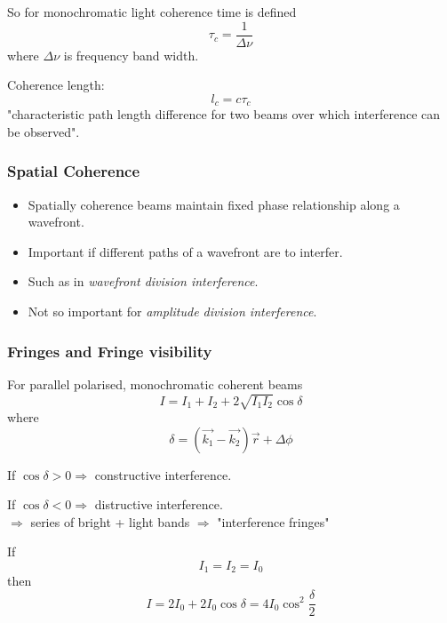 \documentclass[10pt]{article}
\begin{document}
So for monochromatic light coherence time is defined
\begin{equation}\boxed{
\tau_c = \frac{1}{\Delta \nu}
}\end{equation}
where $\Delta \nu$ is frequency band width.

Coherence length:
\begin{equation}\boxed{
l_c = c \tau_c
}\end{equation}
"characteristic path length difference for two beams over which interference can be observed".
\subsubsection{Spatial Coherence}
\begin{itemize}
\item Spatially coherence beams maintain fixed phase relationship along a wavefront.
\item Important if different paths of a wavefront are to interfer.
\item Such as in \textit{wavefront division interference}.
\item Not so important for \textit{amplitude division interference}.
\end{itemize}

\subsubsection{Fringes and Fringe visibility}
For parallel polarised, monochromatic coherent beams
\begin{equation}\boxed{
I = I_1 + I_2 + 2 \sqrt{I_1I_2}\cos{\delta}
}\end{equation}
where
\begin{equation*}
\delta = (\vec{k_1} - \vec{k_2})\vec{r} + \Delta \phi
\end{equation*}

If $\cos{\delta} > 0 \Rightarrow$ constructive interference.

If $\cos{\delta} < 0 \Rightarrow$ distructive interference.\\
$\Rightarrow$ series of bright + light bands $\Rightarrow$ "interference fringes"

If 
\begin{equation*}
I_1 = I_2 = I_0
\end{equation*}
then
\begin{equation}\boxed{
I = 2I_0 + 2I_0 \cos{\delta} = 4I_0 \cos^2{\frac{\delta}{2}}
}\end{equation}
\end{document}
